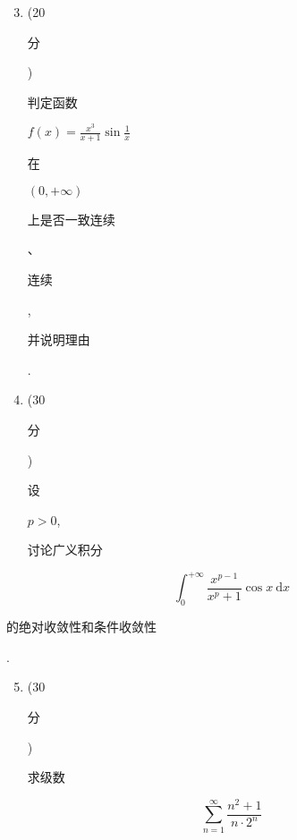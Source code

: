 \documentclass[10pt]{article}
\begin{document}
\begin{enumerate}
  \setcounter{enumi}{2}
  \item (20 \begin{CJK}{UTF8}{mj}分\end{CJK}) \begin{CJK}{UTF8}{mj}判定函数\end{CJK} $f(x)=\frac{x^{3}}{x+1} \sin \frac{1}{x}$ \begin{CJK}{UTF8}{mj}在\end{CJK} $(0,+\infty)$ \begin{CJK}{UTF8}{mj}上是否一致连续\end{CJK}、\begin{CJK}{UTF8}{mj}连续\end{CJK}, \begin{CJK}{UTF8}{mj}并说明理由\end{CJK}.

  \item (30 \begin{CJK}{UTF8}{mj}分\end{CJK}) \begin{CJK}{UTF8}{mj}设\end{CJK} $p>0$, \begin{CJK}{UTF8}{mj}讨论广义积分\end{CJK}

\end{enumerate}
$$
\int_{0}^{+\infty} \frac{x^{p-1}}{x^{p}+1} \cos x \mathrm{~d} x
$$
\begin{CJK}{UTF8}{mj}的绝对收敛性和条件收敛性\end{CJK}.

\begin{enumerate}
  \setcounter{enumi}{4}
  \item (30 \begin{CJK}{UTF8}{mj}分\end{CJK}) \begin{CJK}{UTF8}{mj}求级数\end{CJK}
\end{enumerate}
$$
\sum_{n=1}^{\infty} \frac{n^{2}+1}{n \cdot 2^{n}}
$$
\end{document}
